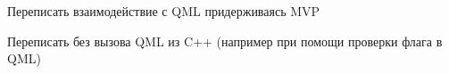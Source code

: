 
\begin{DoxyRefList}
\item[Класс \mbox{\hyperlink{classConfigurator}{Configurator}} ]\label{todo__todo000001}%
%
Переписать взаимодействие с QML придерживаясь MVP  
\item[Член \mbox{\hyperlink{classRadiooooo_ac858a8e6164ce86d1d2c1b05bea806a3}{Radiooooo\+::force\+Pause}} ()]\label{todo__todo000002}%
%
Переписать без вызова QML из C++ (например при помощи проверки флага в QML) 
\end{DoxyRefList}